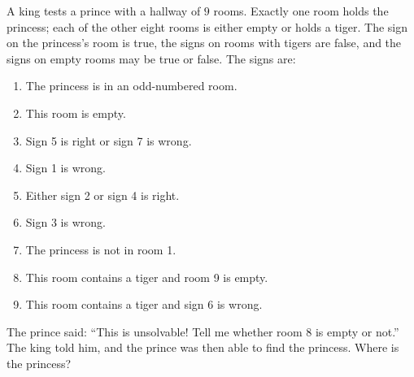 A king tests a prince with a hallway of $9$ rooms. Exactly one room holds the princess; each of the other eight rooms is either empty or holds a tiger. The sign on the princess's room is true, the signs on rooms with tigers are false, and the signs on empty rooms may be true or false. The signs are:
\begin{enumerate}
\item[(1)] The princess is in an odd-numbered room.
\item[(2)] This room is empty.
\item[(3)] Sign 5 is right or sign 7 is wrong.
\item[(4)] Sign 1 is wrong.
\item[(5)] Either sign 2 or sign 4 is right.
\item[(6)] Sign 3 is wrong.
\item[(7)] The princess is not in room 1.
\item[(8)] This room contains a tiger and room 9 is empty.
\item[(9)] This room contains a tiger and sign 6 is wrong.
\end{enumerate}
The prince said: ``This is unsolvable! Tell me whether room 8 is empty or not.'' The king told him, and the prince was then able to find the princess. Where is the princess?
